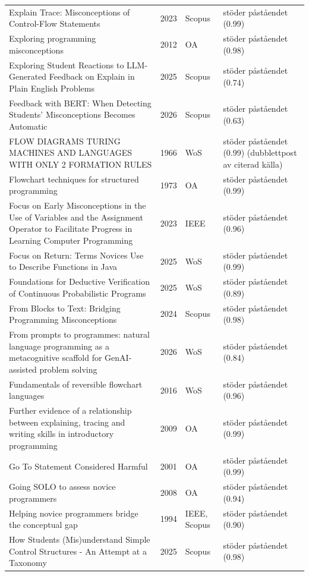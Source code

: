 \begin{longtable}{@{}%
  >{\raggedright\arraybackslash}p{}c%
  >{\raggedright\arraybackslash}p{}%
  >{\raggedright\arraybackslash}p{}@{}}
Explain Trace: Misconceptions of Control-Flow Statements & 2023 & Scopus & stöder påståendet (0.99) \\
Exploring programming misconceptions & 2012 & OA & stöder påståendet (0.98) \\
Exploring Student Reactions to LLM-Generated Feedback on Explain in Plain English Problems & 2025 & Scopus & stöder påståendet (0.74) \\
Feedback with BERT: When Detecting Students' Misconceptions Becomes Automatic & 2026 & Scopus & stöder påståendet (0.63) \\
FLOW DIAGRAMS TURING MACHINES AND LANGUAGES WITH ONLY 2 FORMATION RULES & 1966 & WoS & stöder påståendet (0.99) (dubblettpost av citerad källa) \\
Flowchart techniques for structured programming & 1973 & OA & stöder påståendet (0.99) \\
Focus on Early Misconceptions in the Use of Variables and the Assignment Operator to Facilitate Progress in Learning Computer Programming & 2023 & IEEE & stöder påståendet (0.96) \\
Focus on Return: Terms Novices Use to Describe Functions in Java & 2025 & WoS & stöder påståendet (0.99) \\
Foundations for Deductive Verification of Continuous Probabilistic Programs & 2025 & WoS & stöder påståendet (0.89) \\
From Blocks to Text: Bridging Programming Misconceptions & 2024 & Scopus & stöder påståendet (0.98) \\
From prompts to programmes: natural language programming as a metacognitive scaffold for GenAI-assisted problem solving & 2026 & WoS & stöder påståendet (0.84) \\
Fundamentals of reversible flowchart languages & 2016 & WoS & stöder påståendet (0.96) \\
Further evidence of a relationship between explaining, tracing and writing skills in introductory programming & 2009 & OA & stöder påståendet (0.99) \\
Go To Statement Considered Harmful & 2001 & OA & stöder påståendet (0.99) \\
Going SOLO to assess novice programmers & 2008 & OA & stöder påståendet (0.94) \\
Helping novice programmers bridge the conceptual gap & 1994 & IEEE, Scopus & stöder påståendet (0.90) \\
How Students (Mis)understand Simple Control Structures - An Attempt at a Taxonomy & 2025 & Scopus & stöder påståendet (0.98) \\

\end{longtable}
